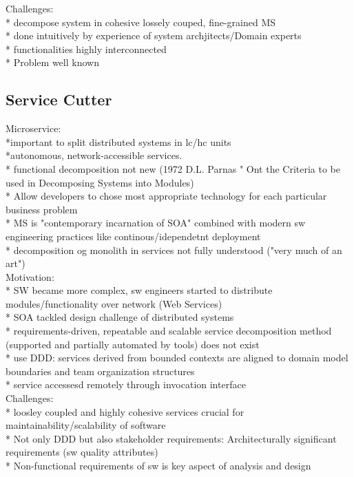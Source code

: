 Challenges:\\
* decompose system in cohesive lossely couped, fine-grained MS \\
* done intuitively by experience of system archjitects/Domain experts\\
* functionalities highly interconnected\\
* Problem well known \\

\subsection{Service Cutter}
\cite{ServiceCutter}

Microservice:\\
*important to split distributed systems in lc/hc units\\
*autonomous, network-accessible services.\\
* functional decomposition not new (1972 D.L. Parnas " Ont the Criteria to be used in Decomposing Systems into Modules)\\
* Allow developers to chose most appropriate technology for each particular business problem\\
* MS is "contemporary incarnation of SOA" combined with modern sw engineering practices like continous/idependetnt deployment\\
* decomposition og monolith in services not fully understood ("very much of an art")\\

Motivation: \\
* SW became more complex, sw engineers  started to distribute modules/functionality over network (Web Services)\\
* SOA tackled design challenge of distributed systems\\
* requirements-driven, repeatable and scalable service decomposition method (supported and partially automated by tools) does not exist\\
* use DDD: services derived from bounded contexts are aligned to domain model boundaries and team organization structures \\
* service accessesd remotely through invocation interface\\

Challenges:\\
* loosley coupled and highly cohesive services crucial for maintainability/scalability of software \\
* Not only DDD but also stakeholder requirements: Architecturally significant requirements (sw quality attributes) \\
* Non-functional requirements of sw is key aspect of analysis and design\\


